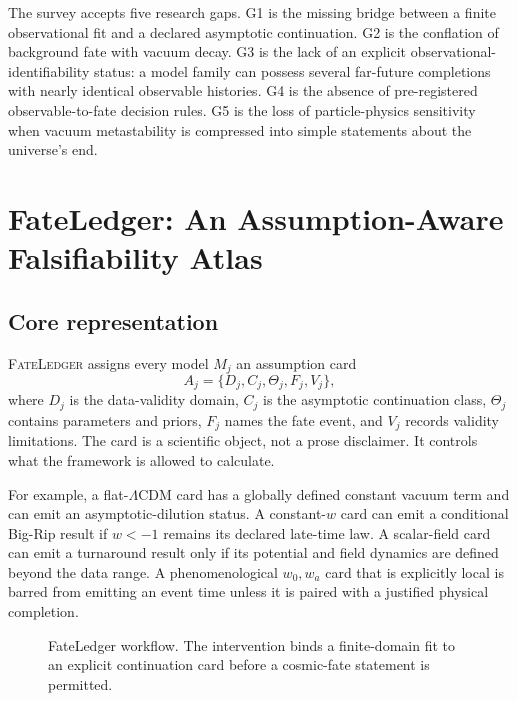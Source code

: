 \documentclass[conference]{IEEEtran}
\newcommand{\lcdm}{\ensuremath{\Lambda\mathrm{CDM}}}
\newcommand{\fateledger}{\textsc{FateLedger}}
\begin{document}
The survey accepts five research gaps. G1 is the missing bridge between a finite observational fit and a declared asymptotic continuation. G2 is the conflation of background fate with vacuum decay. G3 is the lack of an explicit observational-identifiability status: a model family can possess several far-future completions with nearly identical observable histories. G4 is the absence of pre-registered observable-to-fate decision rules. G5 is the loss of particle-physics sensitivity when vacuum metastability is compressed into simple statements about the universe's end.

\section{FateLedger: An Assumption-Aware Falsifiability Atlas}

\subsection{Core representation}

\fateledger{} assigns every model \(M_j\) an assumption card
\begin{equation}
 A_j=\{D_j,C_j,\Theta_j,F_j,V_j\},
\label{eq:assumption-card}
\end{equation}
where \(D_j\) is the data-validity domain, \(C_j\) is the asymptotic continuation class, \(\Theta_j\) contains parameters and priors, \(F_j\) names the fate event, and \(V_j\) records validity limitations. The card is a scientific object, not a prose disclaimer. It controls what the framework is allowed to calculate.

For example, a flat-\lcdm{} card has a globally defined constant vacuum term and can emit an asymptotic-dilution status. A constant-\(w\) card can emit a conditional Big-Rip result if \(w<-1\) remains its declared late-time law. A scalar-field card can emit a turnaround result only if its potential and field dynamics are defined beyond the data range. A phenomenological \(w_0,w_a\) card that is explicitly local is barred from emitting an event time unless it is paired with a justified physical completion.

\begin{figure}[t]
\centering
{}
\caption{FateLedger workflow. The intervention binds a finite-domain fit to an explicit continuation card before a cosmic-fate statement is permitted.}
\label{fig:ledger}
\end{figure}
\end{document}
